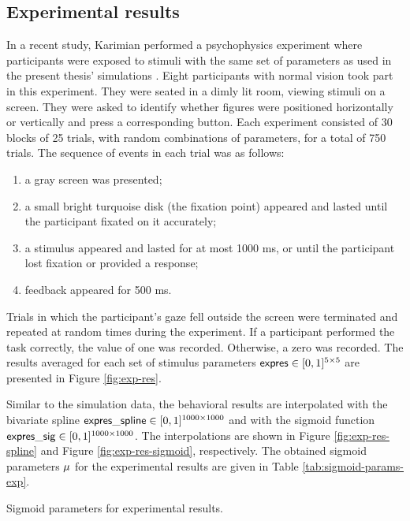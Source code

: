 \subsection{Experimental results}

In a recent study, Karimian performed a psychophysics experiment where participants were exposed to stimuli with the same set of parameters as used in the present thesis' simulations \cite{MaryamPLACEHOLDER}.
Eight participants with normal vision took part in this experiment. They were seated in a dimly lit room, viewing stimuli on a screen. They were asked to identify whether figures were positioned horizontally or vertically and press a corresponding button. Each experiment consisted of 30 blocks of 25 trials, with random combinations of parameters, for a total of 750 trials. The sequence of events in each trial was as follows: 
\begin{enumerate}
    \item a gray screen was presented;
    \item a small bright turquoise disk (the fixation point) appeared and lasted until the participant fixated on it accurately;
    \item a stimulus appeared and lasted for at most 1000 ms, or until the participant lost fixation or provided a response;
    \item feedback appeared for 500 ms.
\end{enumerate}
Trials in which the participant's gaze fell outside the screen were terminated and repeated at random times during the experiment. If a participant performed the task correctly, the value of one was recorded. Otherwise, a zero was recorded.
The results averaged for each set of stimulus parameters $\mathsf{expres} \in [0, 1]^{5 \times 5}$ are presented in Figure \ref{fig:exp-res}. 

Similar to the simulation data, 
the behavioral results are interpolated with the bivariate spline $\mathsf{expres\_spline} \in [0, 1]^{1000 \times 1000}$ and with the sigmoid function $\mathsf{expres\_sig} \in [0, 1]^{1000 \times 1000}$. The interpolations are shown in Figure \ref{fig:exp-res-spline} and Figure \ref{fig:exp-res-sigmoid}, respectively. The obtained sigmoid parameters $\mu$ for the experimental results are given in Table \ref{tab:sigmoid-params-exp}.

\begin{table}[!htp]
    \centering
    
    \caption[Sigmoid parameters for experimental results]{Sigmoid parameters for experimental results.}
    \label{tab:sigmoid-params-exp}
\end{table}

